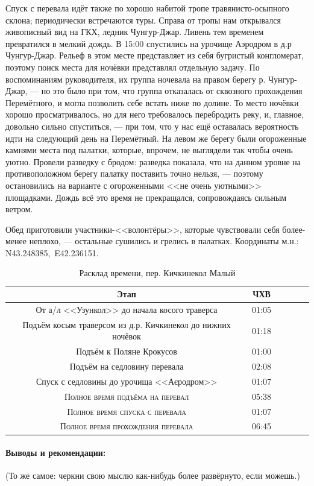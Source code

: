 Спуск с перевала идёт также по хорошо набитой тропе травянисто-осыпного склона; периодически встречаются туры. Справа от тропы нам открывался живописный вид на ГКХ, ледник Чунгур-Джар. Ливень тем временем превратился в мелкий дождь. В 15:00 спустились на урочище Аэродром в д.р Чунгур-Джар. Рельеф в этом месте представляет из себя бугристый конгломерат, поэтому поиск места для ночёвки представлял отдельную задачу. По воспоминаниям руководителя, их группа \cite{Korolyov2018} ночевала на правом берегу р. Чунгур-Джар, --- но это было при том, что группа отказалась от сквозного прохождения Перемётного, и могла позволить себе встать ниже по долине. То место ночёвки хорошо просматривалось, но для него требовалось перебродить реку, и, главное, довольно сильно спуститься, --- при том, что у нас ещё оставалась вероятность идти на следующий день на Перемётный. На левом же берегу были огороженные камнями места под палатки, которые, впрочем, не выглядели так чтобы очень уютно. Провели разведку с бродом: разведка показала, что на данном уровне на противоположном берегу палатку поставить точно нельзя, --- поэтому остановились на варианте с огороженными <<не очень уютными>> площадками. Дождь всё это время не прекращался, сопровождаясь сильным ветром.

Обед приготовили участники-<<волонтёры>>, которые чувствовали себя более-менее неплохо, --- остальные сушились и грелись в палатках. Координаты м.н.: N43.248385\degree,~E42.236151\degree.

\begin{table}[h!]
	\centering
	\begin{tabular}{|c|c|c|c|c|c|} 
		\hline 
		Этап & ЧХВ \\ 	
		\hline 
		От а/л <<Узункол>> до начала косого траверса  & 01:05 \\
		Подъём косым траверсом из д.р. Кичкинекол до нижних ночёвок  & 01:18 \\
		Подъём к Поляне Крокусов & 01:00\\ 
		Подъём на седловину перевала & 02:08\\ 
		Спуск с седловины до урочища <<Аєродром>> & 01:07 \\
		
		\hline
		\textsc{Полное время подъёма на перевал  }& 05:38\\
		\textsc{Полное время спуска с перевала }& 01:07 \\
		\textsc{Полное время прохождения перевала }& 06:45 \\
		\hline
	\end{tabular}
	\caption{Расклад времени, пер. Кичкинекол Малый}
\end{table}

\paragraph{Выводы и рекомендации:} \alert{(То же самое: черкни свою мыслю как-нибудь более развёрнуто, если можешь.)}

\clearpage